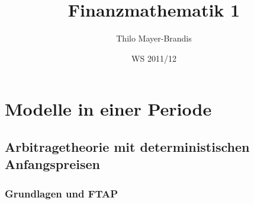 \documentclass[envcountsame,envcountchap,envcountsect,amsart]{svmono}
\begin{document}
\author{Thilo Mayer-Brandis}
\title{Finanzmathematik 1}
\date{WS 2011/12}
\maketitle
\frontmatter%
\tableofcontents
\mainmatter%
\printindex
\part{Modelle in einer Periode}
\chapter{Arbitragetheorie mit deterministischen Anfangspreisen}
\section{Grundlagen und FTAP}
\end{document}
